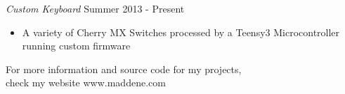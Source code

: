\documentclass[line,margin]{res}
\newenvironment{tightcenter}{%
  \setlength\topsep{0pt}
  \setlength\parskip{0pt}
  \begin{center}
}{%
  \end{center}
}
\begin{document}
\begin{resume}
                {\sl Custom Keyboard} \hfill Summer 2013 - Present
                \begin{itemize}  \itemsep -2pt %
                    \item A variety of Cherry MX Switches processed by a Teensy3 Microcontroller running custom firmware \\[5ex]
                \end{itemize}

                \begin{tightcenter}
                For more information and source code for my projects,\\
                check my website www.maddene.com
                \end{tightcenter}

\end{resume}
\end{document}
